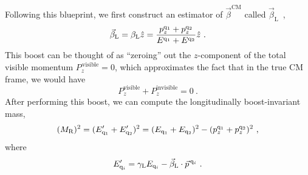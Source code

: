 Following this blueprint, we first construct an
estimator of $\vec\beta^{\mathrm{CM}}$ called $\vec\beta_{\mathrm{L}}$~\cite{rogan,SuperRazor},
\begin{equation}
\vec\beta_{\mathrm{L}} = \beta_{\mathrm{L}}\hat{z} =
\frac{p^{\mathrm{q}_1}_z+ p^{\mathrm{q}_2}_z}{E^{\mathrm{q}_1}+ E^{\mathrm{q}_2}}\hat{z}~.
\end{equation}
This boost can be thought of as ``zeroing'' out the $z$-component of
the total visible momentum $P^{\,\mathrm{visible}}_z=0$, which
approximates the fact that in the true CM frame, we would have
\begin{equation}
P^{\mathrm{visible}}_z + P^{\mathrm{invisible}}_z = 0~.
\end{equation}
After performing this boost, we can compute the longitudinally
boost-invariant mass,
\begin{equation}
(M_\mathrm{R})^2 =(E_{\mathrm{q}_1}^{\prime}+ E_{\mathrm{q}_2}^{\prime})^2 = (E_{\mathrm{q}_1}+ E_{\mathrm{q}_2})^2 - (p^{\mathrm{q}_1}_z+ p^{\mathrm{q}_2}_z)^2~,
\end{equation}
where
\begin{equation}
E_{\mathrm{q}_i}^{\prime} = \gamma_{\mathrm L}E_{\mathrm{q}_i} - \vec\beta_{\mathrm
  L}\cdot \vec p^{\,\mathrm{q}_i} ~.
\end{equation}

